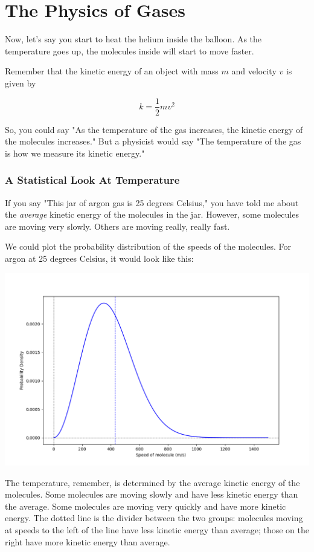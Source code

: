 \chapter{The Physics of Gases}


Now,  let's say you start to heat the helium inside the balloon.  As the temperature goes up,  the molecules inside will start to move faster.

Remember that the kinetic energy of an object with mass $m$ and velocity $v$ is given by

$$k = \frac{1}{2} m v^2$$

So, you could say "As the temperature of the gas increases,  the kinetic energy of the molecules increases."   But a physicist would say "The temperature of the gas is how we measure its kinetic energy."

\subsection{A Statistical Look At Temperature}

If you say "This jar of argon gas is 25 degrees Celsius,"  you have told me about the \emph{average} kinetic energy of the molecules in the jar.  
However,  some molecules are moving very slowly.  Others are moving really,  really fast. 

We could plot the probability distribution of the speeds of the molecules.  For argon at 25 degrees Celsius,  it would look like this:

\includegraphics[width=\textwidth]{ar_plot.png}

The temperature,  remember,  is determined by the average kinetic energy of the molecules.  Some molecules are moving slowly and have less kinetic energy than the average.  Some molecules are moving very quickly and have more kinetic energy.  The dotted line is the divider between the two groups: molecules moving at speeds to the left of the line have less kinetic energy than average; those on the right have more kinetic energy than average.

